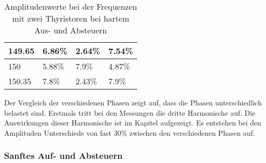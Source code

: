 \begin{table}[ht!]
\begin{tabular}{|l|l|l|l|}
		149.65            & 6.86\%                                                                              & 2.64\%                                                                              & 7.54\%                                                                              \\ \hline
		150               & 5.88\%                                                                              & 7.9\%                                                                               & 4.87\%                                                                              \\ \hline
		150.35            & 7.8\%                                                                               & 2.43\%                                                                              & 7.9\%                                                                               \\ \hline
	\end{tabular}
\caption{Amplitudenwerte bei der Frequenzen mit zwei Thyristoren bei hartem Aus- und Absteuern}\label{tab:Mess_2Thyristoren_Spannung_Widerstand_AufAb_hart}
\end{table}

Der Vergleich der verschiedenen Phasen zeigt auf, dass die Phasen unterschiedlich belastet sind. Erstmals tritt bei den Messungen die dritte Harmonische auf. Die Auswirkungen dieser Harmonische ist im Kapitel  aufgezeigt. Es entstehen bei den Amplituden Unterschiede von fast 30\% zwischen den verschiedenen Phasen auf. 



\newpage
\subsubsection*{Sanftes Auf- und Absteuern}

